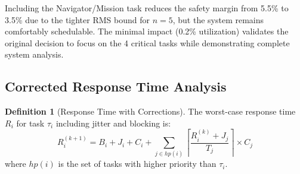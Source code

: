 \documentclass[11pt,a4paper]{article}
\theoremstyle{definition}
\newtheorem{definition}[theorem]{Definition}
\theoremstyle{remark}
\begin{document}
Including the Navigator/Mission task reduces the safety margin from 5.5\% to 3.5\% due to the tighter RMS bound for $n=5$, but the system remains comfortably schedulable. The minimal impact (0.2\% utilization) validates the original decision to focus on the 4 critical tasks while demonstrating complete system analysis.

\subsection{Corrected Response Time Analysis}

\begin{definition}[Response Time with Corrections]
The worst-case response time $R_i$ for task $\tau_i$ including jitter and blocking is:
\begin{equation}
R_i^{(k+1)} = B_i + J_i + C_i + \sum_{j \in hp(i)} \left\lceil \frac{R_i^{(k)} + J_j}{T_j} \right\rceil \times C_j
\end{equation}
where $hp(i)$ is the set of tasks with higher priority than $\tau_i$.
\end{definition}
\end{document}
